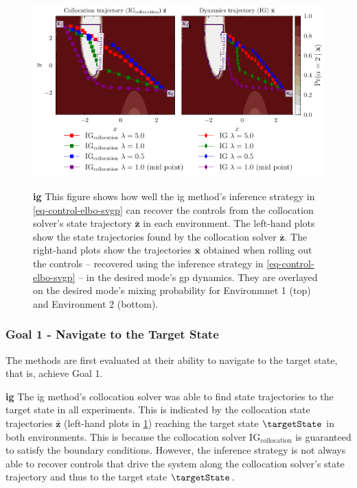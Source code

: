 \documentclass{mimosis-class/mimosis}
\numberwithin{equation}{chapter}
\begin{document}
{\begin{figure}
\begin{minipage}[r]{\columnwidth}
\label{fig-collocation-traj-opt-7}
\end{minipage}
\begin{minipage}[r]{\columnwidth}
\centering
\includegraphics[width=\textwidth]{./images/mode-opt/trajectory_optimisation/collocation_trajectories_over_desired_prob_scenario_5.pdf}
\label{fig-collocation-traj-opt-5}
\end{minipage}
\caption[\acrfull{ig} trajectory optimisation results in simulated environments]{\textbf{\acrfull{ig}}
This figure shows how well the \acrshort{ig} method's inference strategy
in \cref{eq-control-elbo-svgp} can
recover the controls from the collocation solver's state trajectory $\bar{\mathbf{z}}$ in each environment.
The left-hand plots show the state trajectories found by the collocation solver $\bar{\mathbf{z}}$.
The right-hand plots show the trajectories $\bar{\mathbf{x}}$ obtained when
rolling out the controls -- recovered using the inference strategy in \cref{eq-control-elbo-svgp} --
in the desired mode's \acrshort{gp} dynamics.
They are overlayed on the desired mode's mixing probability for Environmnet 1 (top) and Environment 2 (bottom).}
\label{fig-collocation-traj-opt}
\end{figure}

\subsubsection{Goal 1 - Navigate to the Target State}
\label{sec:org72cbc78}
The methods are first evaluated at their ability to navigate to the target state, that is, achieve Goal 1.

\textbf{\acrfull{ig}}
The \acrshort{ig} method's collocation solver was able to
find state trajectories to the target state in all experiments.
This is indicated by the collocation state trajectories \(\bar{\mathbf{z}}\) (left-hand plots in
\cref{fig-collocation-traj-opt}) reaching the target state  \(\targetState\) in both environments.
This is because the collocation solver \(\text{IG}_{\text{collocation}}\) is guaranteed to
satisfy the boundary conditions.
However, the inference strategy is not always able to recover controls that
drive the system along the collocation solver's state trajectory and thus to the target state \(\targetState\).

}
\end{document}
